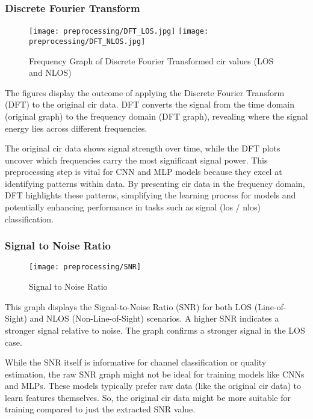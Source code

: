 \subsubsection{Discrete Fourier Transform}\label{dft_visual}

\begin{figure}[H] 
  \centering
  \texttt{[image: preprocessing/DFT\_LOS.jpg]}
  \texttt{[image: preprocessing/DFT\_NLOS.jpg]}
  \caption{Frequency Graph of Discrete Fourier Transformed \acrshort{cir} values (LOS and NLOS)}\label{fig:frequency_graph_dft}
\end{figure}

The figures display the outcome of applying the Discrete Fourier Transform (DFT) to the original \acrshort{cir} data. DFT converts the signal from the time domain (original graph) to the frequency domain (DFT graph), revealing where the signal energy lies across different frequencies.

The original \acrshort{cir} data shows signal strength over time, while the DFT plots uncover which frequencies carry the most significant signal power. This preprocessing step is vital for CNN and MLP models because they excel at identifying patterns within data. By presenting \acrshort{cir} data in the frequency domain, DFT highlights these patterns, simplifying the learning process for models and potentially enhancing performance in tasks such as signal (\gls{los} / \gls{nlos}) classification.

\subsubsection{Signal to Noise Ratio}\label{snr_visual}

\begin{figure}[H]
	\centering
	\texttt{[image: preprocessing/SNR]} %
	\caption{Signal to Noise Ratio}\label{fig:snr}
\end{figure}

This graph displays the Signal-to-Noise Ratio (SNR) for both LOS (Line-of-Sight) and NLOS (Non-Line-of-Sight) scenarios.  A higher SNR indicates a stronger signal relative to noise. The graph confirms a stronger signal in the LOS case.

While the SNR itself is informative for channel classification or quality estimation, the raw SNR graph might not be ideal for training models like CNNs and MLPs. These models typically prefer raw data (like the original \acrshort{cir} data) to learn features themselves. So, the original \acrshort{cir} data might be more suitable for training compared to just the extracted SNR value.

